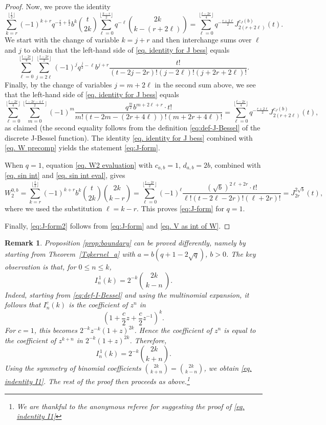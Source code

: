 \documentclass[12pt]{amsart}
\numberwithin{equation}{section}
\theoremstyle{boldremark}
\newtheorem{remark}[theorem]{Remark}
\begin{document}
\begin{proof}
Now, we prove the identity
\begin{equation}\label{eq. identity for J bess}
\sum_{k=r}^{\lfloor\frac{t}{2}\rfloor}(-1)^{k+r} q^{-\frac{r}{2}+\frac{k}{2}}b^k\binom{t}{2k}\sum_{\ell=0}^{\lfloor\frac{k-r}{2}\rfloor}q^{-\ell}\binom{2k}{k-(r+2\ell)} =\sum_{\ell=0}^{\lfloor\frac{t-2r}{4}\rfloor}q^{-\frac{r+2\ell}{2}} J_{2(r+2\ell)}^{c_J(b)}(t).
\end{equation}
We start with the change of variable $k=j+r$ and then interchange sums over $\ell$ and $j$ to obtain that the left-hand side of \eqref{eq. identity for J bess} equals
$$
\sum_{\ell=0}^{\lfloor\frac{t-2r}{4}\rfloor}\sum_{j=2\ell}^{\lfloor\frac{t-2r}{2}\rfloor}(-1)^jq^{\tfrac{j}{2}-\ell}b^{j+r}
\frac{t!}{(t-2j-2r)!(j-2\ell)!(j+2r+2\ell)!}.
$$
Finally, by the change of variables $j=m+2\ell$ in the second sum above, we see that the left-hand side of \eqref{eq. identity for J bess} equals
$$
\sum_{\ell=0}^{\lfloor\frac{t-2r}{4}\rfloor}\sum_{m=0}^{\lfloor\frac{t-2r-4\ell}{2}\rfloor}(-1)^m 
\frac{q^{\tfrac{m}{2}}b^{m+2\ell+r} \cdot t!}{m!(t-2m-(2r+4\ell))!(m+2r+4\ell)!}=\sum_{\ell=0}^{\lfloor\frac{t-2r}{4}\rfloor}q^{-\frac{r+2\ell}{2}} J_{2(r+2\ell)}^{c_J(b)}(t),
$$
as claimed (the second equality follows from the definition \eqref{eq:def-J-Bessel} of the discrete J-Bessel function).
The identity \eqref{eq. identity for J bess} combined with \eqref{eq. W precomp} yields the statement \eqref{eq:J-form}. 

When $q=1$, equation \eqref{eq. W2 evaluation} with $c_{a,b}=1$, $d_{a,b}=2b$, combined with  \eqref{eq. sin int} and \eqref{eq. sin int eval}, gives
$$
W_2^{0,b}=\sum_{k=r}^{\lfloor\frac{t}{2}\rfloor}(-1)^{k+r}b^k \binom{t}{2k} \binom{2k}{k-r}=\sum_{\ell=0}^{\lfloor\frac{t-2r}{2}\rfloor}(-1)^{\ell} \frac{(\sqrt{b})^{2\ell+2r} \cdot t!}{\ell!(t-2\ell-2r)!(\ell+2r)!}=J_{2r}^{2\sqrt{b}}(t),
$$
where we used the substitution $\ell=k-r$. This proves \eqref{eq:J-form} for $q=1$.

Finally,  \eqref{eq:J-form2} follows from \eqref{eq:J-form} and  \eqref{eq. V as int of W}.
\end{proof}

\begin{remark}
Proposition \ref{prop:boundary} can be proved differently, namely by starting from Theorem~\ref{Tqkernel_a} with $a=b(q+1-2\sqrt{q})$, $b>0$. The key observation is that, for $0\leq n\leq k$,
\begin{equation}\label{eq. indentity I1}
I_n^{\,1}(k)=2^{-k}\binom{2k}{\,k-n\,}.
\end{equation}
Indeed, starting from \eqref{eq:def-I-Bessel} and using the multinomial expansion, it follows that $I_n^c(k)$ is the coefficient of $z^n$ in 
\[ \left(1+\frac{c}{2}z+\frac{c}{2}z^{-1}\right)^k. \] 
For $c=1$, this becomes $2^{-k}z^{-k}(1+z)^{2k}$.
Hence the coefficient of $z^n$ is equal to the coefficient of
$z^{k+n}$ in $2^{-k}(1+z)^{2k}$. Therefore,
\[
I_n^{\,1}(k)
=
2^{-k}\binom{2k}{k+n}.
\]
Using the symmetry of binomial coefficients $\binom{2k}{k+n}=\binom{2k}{k-n}$, we obtain \eqref{eq. indentity I1}. The rest of the proof then proceeds as above.\footnote{We are thankful to the anonymous referee for suggesting the proof of \eqref{eq. indentity I1}}
\end{remark}
\end{document}
